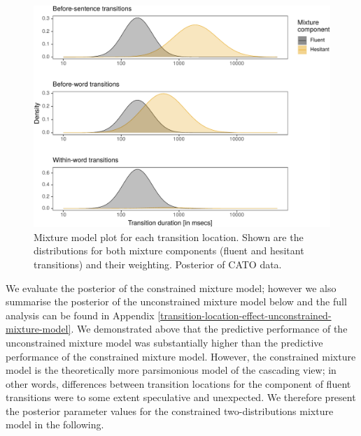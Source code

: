 \documentclass[
  man,floatsintext]{apa7}
\begin{document}
\begin{figure}

{\centering \includegraphics{manuscript_files/figure-latex/mixmodel-1} 

}

\caption{Mixture model plot for each transition location. Shown are the distributions for both mixture components (fluent and hesitant transitions) and their weighting. Posterior of CATO data.}\label{fig:mixmodel}
\end{figure}

We evaluate the posterior of the constrained mixture model; however we also summarise the posterior of the unconstrained mixture model below and the full analysis can be found in Appendix \ref{transition-location-effect-unconstrained-mixture-model}. We demonstrated above that the predictive performance of the unconstrained mixture model was substantially higher than the predictive performance of the constrained mixture model. However, the constrained mixture model is the theoretically more parsimonious model of the cascading view; in other words, differences between transition locations for the component of fluent transitions were to some extent speculative and unexpected. We therefore present the posterior parameter values for the constrained two-distributions mixture model in the following.
\end{document}
